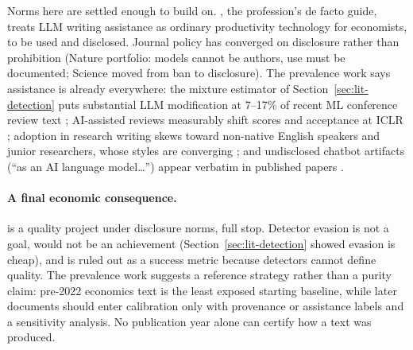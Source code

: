 Norms here are settled enough to build on. \citet{korinek2023generative},
the profession's de facto guide, treats LLM writing assistance as ordinary
productivity technology for economists, to be used and disclosed. Journal
policy has converged on disclosure rather than prohibition (Nature
portfolio: models cannot be authors, use must be documented; Science moved
from ban to disclosure). The prevalence work says assistance is already
everywhere: the mixture estimator of Section~\ref{sec:lit-detection} puts
substantial LLM modification at 7--17\% of recent ML conference review text
\citep{liang2024monitoring, liang2024mapping}; AI-assisted reviews
measurably shift scores and acceptance at ICLR \citep{latona2024lottery};
adoption in research writing skews toward non-native English speakers and
junior researchers, whose styles are converging \citep{lin2025divergent};
and undisclosed chatbot artifacts (``as an AI language model\ldots'')
appear verbatim in published papers \citep{glynn2024academai}.

\paragraph{A final economic consequence.} \hv{} is a quality project under
disclosure norms, full stop. Detector evasion is not a goal, would not be an
achievement (Section~\ref{sec:lit-detection} showed evasion is cheap), and
is ruled out as a success metric because detectors cannot define quality.
The prevalence work suggests a reference strategy rather than a purity claim:
pre-2022 economics text is the least exposed starting baseline, while later
documents should enter calibration only with provenance or assistance labels
and a sensitivity analysis. No publication year alone can certify how a text
was produced.
